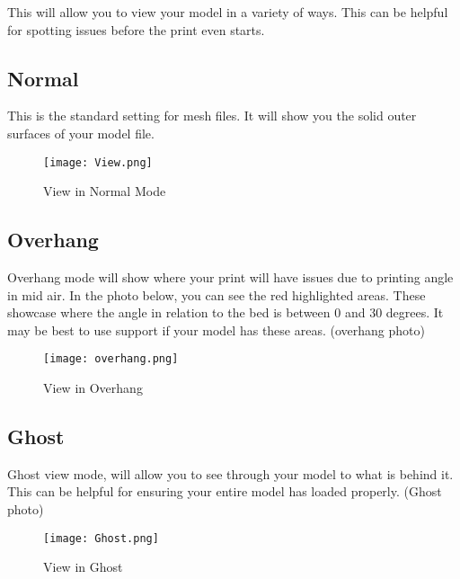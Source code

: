 This will allow you to view your model in a variety of ways. This can be helpful for spotting issues before the print even starts. 

\subsection{Normal}
This is the standard setting for mesh files. It will show you the solid outer surfaces of your model file. 


\begin{figure}[hbt]
\centering
\texttt{[image: View.png]}
\caption{View in Normal Mode}
\label{fig:Normal View}
\end{figure}

\subsection{Overhang}

Overhang mode will show where your print will have issues due to printing angle in mid air. In the photo below, you can see the red highlighted areas. These showcase where the angle in relation to the bed is between 0 and 30 degrees. It may be best to use support if your model has these areas. (overhang photo)

\begin{figure}[hbt]
\centering
\texttt{[image: overhang.png]}
\caption{View in Overhang}
\label{fig:Overhang View}
\end{figure}

\subsection{Ghost}

Ghost view mode, will allow you to see through your model to what is behind it. This can be helpful for ensuring your entire model has loaded properly. (Ghost photo)
\begin{figure}[hbt]
\centering
\texttt{[image: Ghost.png]}
\caption{View in Ghost}
\label{fig:Ghost View}
\end{figure}

